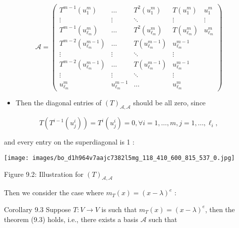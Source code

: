 \documentclass[11pt]{article}
\begin{document}
\[
\mathcal{A} = \left( \begin{matrix} {T}^{m - 1}\left( {u}_1^{m}\right) & \ldots & {T}^2\left( {u}_1^{m}\right) & T\left( {u}_1^{m}\right) & {u}_1^{m} \\  \vdots & \vdots &  \ddots  & \vdots & \vdots \\  {T}^{m - 1}\left( {u}_{{\ell }_{m}}^{m}\right) & \ldots & {T}^2\left( {u}_{{\ell }_{m}}^{m}\right) & T\left( {u}_{{\ell }_{m}}^{m}\right) & {u}_{{\ell }_{m}}^{m} \\  {T}^{m - 2}\left( {u}_{{\ell }_{m}}^{m - 1}\right) & \ldots & T\left( {u}_{{\ell }_{m}}^{m - 1}\right) & {u}_{{\ell }_{m}}^{m - 1} & \\  \vdots & \vdots &  \ddots  & \vdots & \\  {T}^{m - 2}\left( {u}_{{\ell }_{m}}^{m - 1}\right) & \ldots & T\left( {u}_{{\ell }_{m}}^{m - 1}\right) & {u}_{{\ell }_{m}}^{m - 1} & \\  \vdots & \vdots &  \ddots  & \vdots & \\  {u}_{{\ell }_{m}}^{m} & {u}_{{\ell }_{m}}^{m - 1} & \ldots & {u}_{{\ell }_{m}}^{m} &  \end{matrix}\right)
\]

\begin{itemize}
\item Then the diagonal entries of \({\left( T\right) }_{\mathcal{A},\mathcal{A}}\) should be all zero, since
\end{itemize}

\[
T\left( {{T}^{i - 1}\left( {u}_{j}^{i}\right) }\right)  = {T}^{i}\left( {u}_{j}^{i}\right)  = 0,\forall i = 1,\ldots ,m,j = 1,\ldots ,{\ell }_{i},
\]

and every entry on the superdiagonal is 1 :

\begin{center}
\texttt{[image: images/bo\_d1h964v7aajc7382l5mg\_118\_410\_600\_815\_537\_0.jpg]}
\end{center}
\hspace*{3em} 

Figure 9.2: Illustration for \({\left( T\right) }_{\mathcal{A},\mathcal{A}}\)

Then we consider the case where \({m}_{T}\left( x\right)  = {\left( x - \lambda \right) }^{e}\) :

Corollary 9.3 Suppose \(T : V \rightarrow  V\) is such that \({m}_{T}\left( x\right)  = {\left( x - \lambda \right) }^{e}\), then the theorem (9.3) holds, i.e., there exists a basis \(\mathcal{A}\) such that
\end{document}
